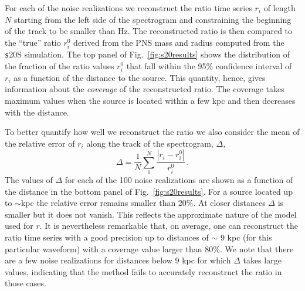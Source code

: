 For each of the noise realizations we reconstruct the ratio time series {$r_i$} of length $N$ starting from the left side of the spectrogram and constraining the beginning of the track to be smaller than \unit[200]{Hz}. 
The reconstructed ratio is then compared to the ``true'' ratio {$r_i^0$} derived from the PNS mass and radius computed from the {\texttt s20S} simulation. The top panel of Fig.~\ref{fig:s20results} shows the distribution of the fraction of the ratio values {$r_i^0$} that fall within the 95\% confidence interval of {$r_i$} as a function of the distance to the source. This quantity, hence, gives information about the {\it coverage} of the reconstructed ratio. The coverage takes maximum values when the source is located within a few kpc and then decreases with the distance.

To better quantify how well we reconstruct the ratio we also consider  the mean of the relative error of $r_i$ along 
the track of the spectrogram, $\Delta$,  
\begin{equation}
\Delta=\frac{1}{N}\sum_1^N\frac{|r_i-r_i^0|}{r_i^0}\,.
\end{equation}
The values of $\Delta$ for each of the 100 noise realizations are shown as a function of the distance
in the bottom panel of Fig.~\ref{fig:s20results}. For a source located up to $\sim$\unit[9]{kpc} the relative error
remains smaller than 20\%. At closer distances $\Delta$ is smaller but it does not vanish. This reflects the approximate nature of the model used for $r$. It is nevertheless remarkable that, on average, one can reconstruct the ratio time series with a good
precision up to distances of $\sim$ 9 kpc (for this particular waveform) with a coverage value
larger than 80\%. We note that there are a few noise realizations for distances below 9 kpc for which
$\Delta$ takes large values, indicating that the method fails to accurately reconstruct the ratio in those cases. 

